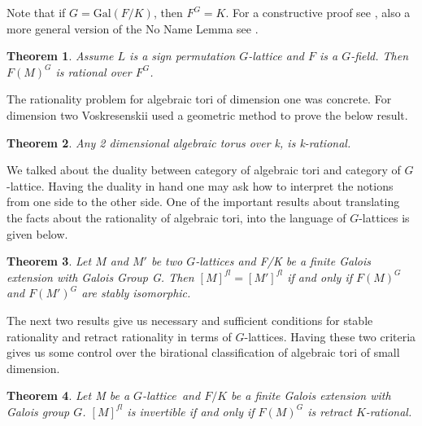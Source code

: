 \documentclass[a4paper, 14pt]{extarticle}
\theoremstyle{plain}
\newtheorem{theorem}{Theorem}
\theoremstyle{definition}
\newcommand{\G}{G}
\newcommand{\glat}{$G$-lattice}
\begin{document}
\noindent
Note that if $\G = \mathrm{Gal} (F/K)$, then $F^\G = K$. For a constructive proof see 
\cite{Armin}, also a more general version of the No Name Lemma see \cite{Domokos}.
\begin{theorem}\cite[Proposition 9.5.1]{Lorenz}\label{SignPermRational}
Assume $L$ is a sign permutation $G$-lattice and $F$ is a $G$-field. Then $F(M)^G$ 
is rational over $F^G$.
\end{theorem}
\noindent
The rationality problem for algebraic tori of dimension one was concrete. For 
dimension two Voskresenskii used a geometric method to prove the below result. 
\begin{theorem}
\cite{Vos67} Any 2 dimensional algebraic torus over k, is k-rational.
\end{theorem} 
\noindent
We talked about the duality between category of algebraic tori and category of \glat . 
Having the duality in hand one may ask how to interpret the notions from one side to 
the other side. One of the important results about translating the facts about the 
rationality of algebraic tori, into the language of \glat s is given below.
\begin{theorem}\cite{Vos74}
Let $M$ and $M'$ be two \glat s  and F/K be a finite Galois extension with Galois 
Group \G . Then $[M]^{fl}=[M']^{fl}$ if and only if $ F(M)^\G $ and $ F(M')^\G$ are 
stably isomorphic.
\end{theorem}
\noindent
The next two results give us necessary and sufficient conditions for stable rationality 
and retract rationality in terms of \glat  s. Having these two criteria gives us some 
control over the birational classification of algebraic tori of small dimension.
\begin{theorem}\cite[Theorem 9.5.4]{Lorenz} Let M be a \glat \,
and $F/K$ be a finite Galois extension with Galois group $G$. $[M]^{fl}$ is invertible 
if and only if $F(M)^\G$ is retract $K$-rational.
\end{theorem}
\end{document}
